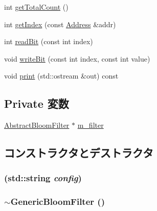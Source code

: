 \begin{DoxyCompactItemize}
int \hyperlink{classGenericBloomFilter_a97f66183ea41a7c123bab9dd5313a74a}{getTotalCount} ()
\item 
int \hyperlink{classGenericBloomFilter_a19f42f6f2fc3501021b768f0df8108b2}{getIndex} (const \hyperlink{classAddress}{Address} \&addr)
\item 
int \hyperlink{classGenericBloomFilter_a6f8a98d0f38a8d122d4cbf87323484eb}{readBit} (const int index)
\item 
void \hyperlink{classGenericBloomFilter_ac188318778d26b44f567c5b530598c16}{writeBit} (const int index, const int value)
\item 
void \hyperlink{classGenericBloomFilter_ac55fe386a101fbae38c716067c9966a0}{print} (std::ostream \&out) const 
\end{DoxyCompactItemize}
\subsection*{Private 変数}
\begin{DoxyCompactItemize}
\item 
\hyperlink{classAbstractBloomFilter}{AbstractBloomFilter} $\ast$ \hyperlink{classGenericBloomFilter_a782a41d6e6400f2a9b744e79f4a84550}{m\_\-filter}
\end{DoxyCompactItemize}


\subsection{コンストラクタとデストラクタ}
\hypertarget{classGenericBloomFilter_a4727c17091f00a566704555cd71963d1}{
\subsubsection[{GenericBloomFilter}]{ (std::string {\em config})}}
\label{classGenericBloomFilter_a4727c17091f00a566704555cd71963d1}
\hypertarget{classGenericBloomFilter_aa54f36388bcade392a04a87cbcffcec1}{
\subsubsection[{$\sim$GenericBloomFilter}]{\setlength{\rightskip}{0pt plus 5cm}$\sim${\bf GenericBloomFilter} ()}}
\label{classGenericBloomFilter_aa54f36388bcade392a04a87cbcffcec1}




